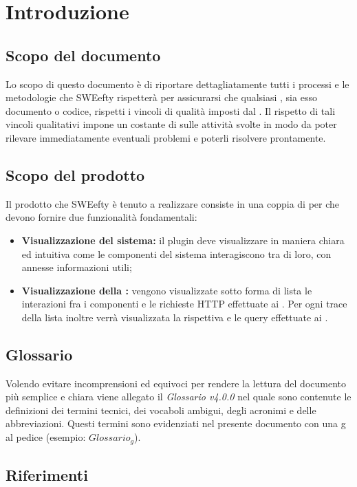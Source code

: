 \section{Introduzione}
\label{sec:intro}
	\subsection{Scopo del documento}
	Lo scopo di questo documento è di riportare dettagliatamente tutti i processi e le metodologie che SWEefty rispetterà per assicurarsi che qualsiasi , sia esso documento o codice, rispetti i vincoli di qualità imposti dal .
	Il rispetto di tali vincoli qualitativi impone un costante  di  sulle attività svolte in modo da poter rilevare immediatamente eventuali problemi e poterli risolvere prontamente.
	
	\subsection{Scopo del prodotto}
	Il prodotto che SWEefty è tenuto a realizzare consiste in una coppia di  per  che devono fornire due funzionalità fondamentali:
	\begin{itemize}
		\item \textbf{Visualizzazione  del sistema:} il plugin deve visualizzare in maniera chiara ed intuitiva come le componenti del sistema interagiscono tra di loro, con annesse informazioni utili;
		\item \textbf{Visualizzazione della :} vengono visualizzate sotto forma di lista le interazioni fra i componenti e le richieste HTTP effettuate ai . Per ogni trace della lista inoltre verrà visualizzata la rispettiva  e le query effettuate ai .
	\end{itemize}

	\subsection{Glossario}
	Volendo evitare incomprensioni  ed equivoci per rendere la lettura del documento più semplice e chiara viene allegato il \emph{Glossario v4.0.0} nel quale sono contenute le definizioni dei termini tecnici, dei vocaboli ambigui, degli acronimi e delle abbreviazioni. Questi termini sono evidenziati nel presente documento con una g al pedice (esempio: $Glossario_{g}$).
	\subsection{Riferimenti}
